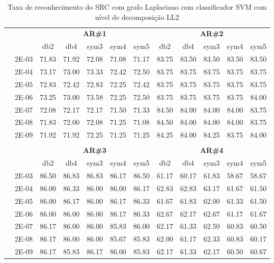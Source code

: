 \begin{table}[H]
	\centering
    \normalsize
	\caption{Taxa de reconhecimento do SRC com grafo Laplaciano com classificador SVM com nível de decomposição LL2}
	\begin{tabular}{|c|c|c c c c c|c c c c c|}
\cline{3-12}
\multicolumn{2}{c|}{\multirow{2}{*}{}} & \multicolumn{5}{c|}{\textbf{AR\#1}}  & \multicolumn{5}{c|}{\textbf{AR\#2}} \\\cline{3-12}

\multicolumn{2}{c|}{}  & db2 & db4 & sym3 & sym4 & sym5 & db2 & db4& sym3 & sym4 & sym5 \\\hline
\multicolumn{1}{|c|}{ \multirow{6}{*}{\rotatebox[origin=c]{90}{\textbf{Gamma}}} }
&2E-03&	71.83&	71.92&	72.08	&71.08&	71.17&	83.75&	83.50&	83.50	&83.50&	83.50	\\\cline{2-12}
&2E-04&	73.17&	73.00&	73.33	&72.42&	72.50&	83.75&	83.75&	83.75	&83.75&	83.75	\\\cline{2-12}
&2E-05&	72.83&	72.42&	72.83	&72.25&	72.42&	83.75&	83.75&	83.75	&83.75&	83.75	\\\cline{2-12}
&2E-06&	73.25&	73.00&	73.58	&72.25&	72.50&	83.75&	83.75&	83.75	&83.75&	84.00	\\\cline{2-12}
&2E-07&	72.08&	72.17&	72.17	&71.50&	71.33&	84.50&	84.00&	84.00	&84.00&	83.75	\\\cline{2-12}
&2E-08&	71.83&	72.00&	72.08	&71.25&	71.08&	84.50&	84.00&	84.00	&84.00&	83.75	\\\cline{2-12}
&2E-09&	71.92&	71.92&	72.25	&71.25&	71.25&	84.25&	84.00&	84.25	&83.75&	84.00	



	
\\ \midrule
\multicolumn{12}{c}{}\\ 

\cline{3-12}
\multicolumn{2}{c}{} & \multicolumn{5}{|c|}{\textbf{AR\#3}}  & \multicolumn{5}{c|}{\textbf{AR\#4}} \\\cline{3-12}
\multicolumn{2}{c}{}  & \multicolumn{1}{|c}{db2} & db4 & sym3 & sym4 & sym5 & db2 & db4& sym3 & sym4 & sym5 \\\hline
\multicolumn{1}{|c|}{ \multirow{6}{*}{\rotatebox[origin=c]{90}{\textbf{Gamma}}} }
&2E-03&	86.50&	86.83&	86.83	&86.17&	86.50&	61.17&	60.17&	61.83	&58.67&	58.67	\\\cline{2-12}
&2E-04&	86.00&	86.33&	86.00	&86.00&	86.17&	62.83&	62.83&	63.17	&61.67&	61.50	\\\cline{2-12}
&2E-05&	86.00&	86.17&	86.00	&86.17&	86.33&	61.67&	61.83&	62.00	&61.33&	61.50	\\\cline{2-12}
&2E-06&	86.00&	86.00&	86.00	&86.17&	86.33&	62.67&	62.17&	62.67	&61.17&	61.67	\\\cline{2-12}
&2E-07&	86.17&	86.00&	86.00	&85.83&	86.00&	62.17&	61.33&	62.50	&60.83&	60.50	\\\cline{2-12}
&2E-08&	86.17&	86.00&	86.00	&85.67&	85.83&	62.00&	61.17&	62.33	&60.83&	60.17	\\\cline{2-12}
&2E-09&	86.17&	85.83&	86.17	&86.00&	85.83&	62.17&	61.33&	62.17	&60.50&	60.67	
\\\midrule
\end{tabular}
\end{table}


